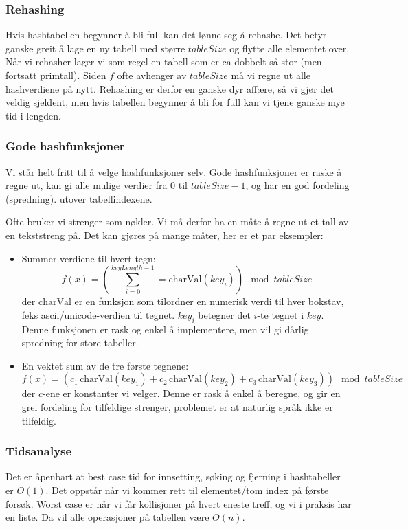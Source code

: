 \subsubsection{Rehashing}
Hvis hashtabellen begynner å bli full kan det lønne seg å rehashe. Det betyr ganske greit å lage en ny tabell med større $ tableSize $ og flytte alle elementet over. Når vi rehasher lager vi som regel en tabell som er ca dobbelt så stor (men fortsatt primtall). Siden $ f $ ofte avhenger av $ tableSize $ må vi regne ut alle hashverdiene på nytt. Rehashing er derfor en ganske dyr affære, så vi gjør det veldig sjeldent, men hvis tabellen begynner å bli for full kan vi tjene ganske mye tid i lengden. 


\subsubsection{Gode hashfunksjoner}
Vi står helt fritt til å velge hashfunksjoner selv. Gode hashfunksjoner er raske å regne ut, kan gi alle mulige verdier fra $ 0 $ til $ tableSize - 1 $, og har en god fordeling (spredning). utover tabellindexene. 

Ofte bruker vi strenger som nøkler. Vi må derfor ha en måte å regne ut et tall av en tekststreng på. Det kan gjøres på mange måter, her er et par eksempler:
\begin{itemize}
\item Summer verdiene til hvert tegn:
\[ f(x) = \left( \sum_{i=0}^{keyLength-1} = \text{charVal}(key_i) \right) \mod{tableSize} \]
der $ \text{charVal} $ er en funksjon som tilordner en numerisk verdi til hver bokstav, feks ascii/unicode-verdien til tegnet. $ key_i $ betegner det $ i $-te tegnet i $ key $. Denne funksjonen er rask og enkel å implementere, men vil gi dårlig spredning for store tabeller. 
\item En vektet sum av de tre første tegnene:
\[ f(x) = \left( c_1\,\text{charVal}(key_1) + c_2\,\text{charVal}(key_2) + c_3\,\text{charVal}(key_3)\right)  \mod{tableSize} \]
der $ c $-ene er konstanter vi velger. Denne er rask å enkel å beregne, og gir en grei fordeling for tilfeldige strenger, problemet er at naturlig språk ikke er tilfeldig.
\end{itemize}


\subsubsection{Tidsanalyse}
Det er åpenbart at best case tid for innsetting, søking og fjerning i hashtabeller er $ O(1) $. Det oppstår når vi kommer rett til elementet/tom index på første forsøk. Worst case er når vi får kollisjoner på hvert eneste treff, og vi i praksis har en liste. Da vil alle operasjoner på tabellen være $ O(n) $. 

